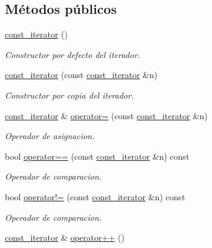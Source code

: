 \subsection*{Métodos públicos}
\begin{DoxyCompactItemize}
\item 
\mbox{\hyperlink{classstring__map_1_1const__iterator_a6c7cbae47a985db380135c930a7a507f}{const\+\_\+iterator}} ()
\begin{DoxyCompactList}\small\item\em Constructor por defecto del iterador. \end{DoxyCompactList}\item 
\mbox{\hyperlink{classstring__map_1_1const__iterator_ae604ca320da8c0ed635bdf7cf70dc62b}{const\+\_\+iterator}} (const \mbox{\hyperlink{classstring__map_1_1const__iterator}{const\+\_\+iterator}} \&n)
\begin{DoxyCompactList}\small\item\em Constructor por copia del iterador. \end{DoxyCompactList}\item 
\mbox{\hyperlink{classstring__map_1_1const__iterator}{const\+\_\+iterator}} \& \mbox{\hyperlink{classstring__map_1_1const__iterator_af77133bc617118fa4fd8b28cebb6c01e}{operator=}} (const \mbox{\hyperlink{classstring__map_1_1const__iterator}{const\+\_\+iterator}} \&n)
\begin{DoxyCompactList}\small\item\em Operador de asignacion. \end{DoxyCompactList}\item 
bool \mbox{\hyperlink{classstring__map_1_1const__iterator_ac383d9e25f6acb73964f39293a9d93a7}{operator==}} (const \mbox{\hyperlink{classstring__map_1_1const__iterator}{const\+\_\+iterator}} \&n) const
\begin{DoxyCompactList}\small\item\em Operador de comparacion. \end{DoxyCompactList}\item 
bool \mbox{\hyperlink{classstring__map_1_1const__iterator_a37795e1ca2aea1271315d4c244fff188}{operator!=}} (const \mbox{\hyperlink{classstring__map_1_1const__iterator}{const\+\_\+iterator}} \&n) const
\begin{DoxyCompactList}\small\item\em Operador de comparacion. \end{DoxyCompactList}\item 
\mbox{\hyperlink{classstring__map_1_1const__iterator}{const\+\_\+iterator}} \& \mbox{\hyperlink{classstring__map_1_1const__iterator_a89c1052c14532e8a7ef1e0bb5846b27a}{operator++}} ()

\end{DoxyCompactItemize}
